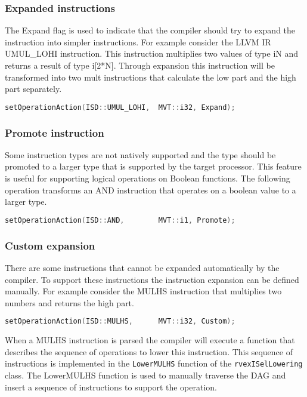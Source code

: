 \subsubsection{Expanded instructions}
The Expand flag is used to indicate that the compiler should try to expand the instruction into simpler instructions. 
For example consider the LLVM IR UMUL\_LOHI instruction. This instruction multiplies two values of type iN and returns a result of type i[2*N]. Through expansion this instruction will be transformed into two mult instructions that calculate the low part and the high part separately.

\begin{lstlisting}[language=c] 
setOperationAction(ISD::UMUL_LOHI,  MVT::i32, Expand);
\end{lstlisting}

\subsubsection{Promote instruction}
Some instruction types are not natively supported and the type should be promoted to a larger type that is supported by the target processor. This feature is useful for supporting logical operations on Boolean functions. The following operation transforms an AND instruction that operates on a boolean value to a larger type.

\begin{lstlisting}[language=c] 
setOperationAction(ISD::AND,        MVT::i1, Promote);
\end{lstlisting}

\subsubsection{Custom expansion}
There are some instructions that cannot be expanded automatically by the compiler. To support these instructions the instruction expansion can be defined manually. For example consider the MULHS instruction that multiplies two numbers and returns the high part.

\begin{lstlisting}[language=c] 
setOperationAction(ISD::MULHS,      MVT::i32, Custom);
\end{lstlisting}

When a MULHS instruction is parsed the compiler will execute a function that describes the sequence of operations to lower this instruction. This sequence of instructions is implemented in the \texttt{LowerMULHS} function of the \texttt{rvexISelLowering} class. The LowerMULHS function is used to manually traverse the DAG and insert a sequence of instructions to support the operation.

